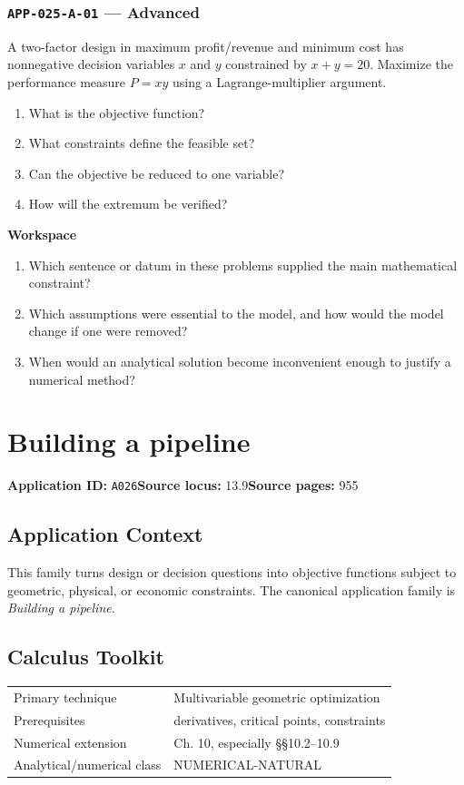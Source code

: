 \documentclass[11pt]{book}
\newcommand{\pid}[1]{\texttt{#1}}
\newcommand{\workspace}{\par\vspace{0.7in}\hrulefill\par\vspace{0.55in}\hrulefill\par}
\begin{document}
\subsection*{\pid{APP-025-A-01} — Advanced}
\begin{problembox}
A two-factor design in maximum profit/revenue and minimum cost has nonnegative decision variables $x$ and $y$ constrained by $x+y=20$. Maximize the performance measure $P=xy$ using a Lagrange-multiplier argument.
\end{problembox}
\begin{promptbox}\begin{enumerate}
\item What is the objective function?
\item What constraints define the feasible set?
\item Can the objective be reduced to one variable?
\item How will the extremum be verified?
\end{enumerate}\end{promptbox}
\textbf{Workspace}\workspace
\begin{reflectionbox}\begin{enumerate}
\item Which sentence or datum in these problems supplied the main mathematical constraint?
\item Which assumptions were essential to the model, and how would the model change if one were removed?
\item When would an analytical solution become inconvenient enough to justify a numerical method?
\end{enumerate}\end{reflectionbox}
\chapter{Building a pipeline}\label{app:A026}
\textbf{Application ID:} \pid{A026}\quad \textbf{Source locus:} 13.9\quad \textbf{Source pages:} 955
\section*{Application Context}
This family turns design or decision questions into objective functions subject to geometric, physical, or economic constraints. The canonical application family is \emph{Building a pipeline}.
\section*{Calculus Toolkit}
\begin{tabularx}{\textwidth}{@{}lX@{}}\toprule
Primary technique & Multivariable geometric optimization \\
Prerequisites & derivatives, critical points, constraints \\
Numerical extension & Ch. 10, especially §§10.2–10.9 \\
Analytical/numerical class & NUMERICAL-NATURAL \\
\bottomrule\end{tabularx}
\end{document}
